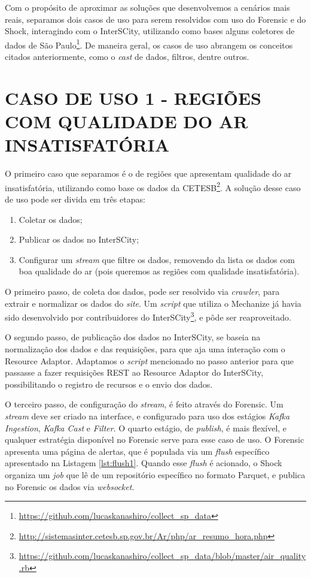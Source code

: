 Com o propósito de aproximar as soluções que desenvolvemos a cenários mais reais,
separamos dois casos de uso para serem resolvidos com uso do Forensic e do
Shock, interagindo com o InterSCity, utilizando como bases alguns coletores de
dados de São
Paulo\footnote{\url{https://github.com/lucaskanashiro/collect_sp_data}}. De
maneira geral, os casos de uso abrangem os conceitos citados anteriormente,
como o \textit{cast} de dados, filtros, dentre outros.

\section{CASO DE USO 1 - REGIÕES COM QUALIDADE DO AR INSATISFATÓRIA}

O primeiro caso que separamos é o de regiões que apresentam qualidade do ar
insatisfatória, utilizando como base os dados da
CETESB\footnote{\url{http://sistemasinter.cetesb.sp.gov.br/Ar/php/ar_resumo_hora.php}}.
A solução desse caso de uso pode ser divida em três etapas:
\begin{enumerate}
    \item Coletar os dados;
    \item Publicar os dados no InterSCity;
    \item Configurar um \textit{stream} que filtre os dados, removendo
        da lista os dados com boa qualidade do ar (pois queremos as regiões
        com qualidade insatisfatória).
\end{enumerate}

O primeiro passo, de coleta dos dados, pode ser resolvido via \textit{crawler},
para extrair e normalizar os dados do \textit{site}. Um \textit{script} que
utiliza o Mechanize já havia sido desenvolvido por contribuidores do
InterSCity\footnote{\url{https://github.com/lucaskanashiro/collect_sp_data/blob/master/air_quality.rb}},
e pôde ser reaproveitado.

O segundo passo, de publicação dos dados no InterSCity, se baseia na
normalização dos dados e das requisições, para que aja uma interação com o
Resource Adaptor. Adaptamos o \textit{script} mencionado no passo anterior
para que passasse a fazer requisições REST ao Resource Adaptor do InterSCity,
possibilitando o registro de recursos e o envio dos dados.

O terceiro passo, de configuração do \textit{stream}, é feito através do Forensic.
Um \textit{stream} deve ser criado na interface, e configurado para uso dos
estágios \textit{Kafka Ingestion}, \textit{Kafka Cast} e \textit{Filter}.
O quarto estágio, de \textit{publish}, é mais flexível, e qualquer
estratégia disponível no Forensic serve para esse caso de uso. O Forensic
apresenta uma página de alertas, que é populada via um \textit{flush}
específico apresentado na Listagem \ref{lst:flush1}. Quando esse
\textit{flush} é acionado, o Shock organiza um \textit{job}
que lê de um repositório específico no formato Parquet, e publica no Forensic
os dados via \textit{websocket}.

